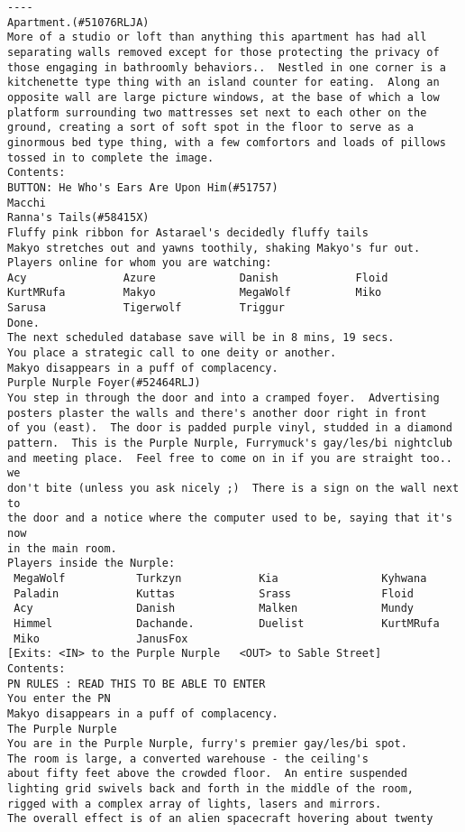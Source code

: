 \begin{verbatim}
----
Apartment.(#51076RLJA)
More of a studio or loft than anything this apartment has had all separating walls removed except for those protecting the privacy of those engaging in bathroomly behaviors..  Nestled in one corner is a kitchenette type thing with an island counter for eating.  Along an opposite wall are large picture windows, at the base of which a low platform surrounding two mattresses set next to each other on the ground, creating a sort of soft spot in the floor to serve as a ginormous bed type thing, with a few comfortors and loads of pillows tossed in to complete the image.
Contents:
BUTTON: He Who's Ears Are Upon Him(#51757)
Macchi
Ranna's Tails(#58415X)
Fluffy pink ribbon for Astarael's decidedly fluffy tails
Makyo stretches out and yawns toothily, shaking Makyo's fur out.
Players online for whom you are watching:
Acy               Azure             Danish            Floid             
KurtMRufa         Makyo             MegaWolf          Miko              
Sarusa            Tigerwolf         Triggur           
Done.
The next scheduled database save will be in 8 mins, 19 secs.
You place a strategic call to one deity or another.
Makyo disappears in a puff of complacency.
Purple Nurple Foyer(#52464RLJ)
You step in through the door and into a cramped foyer.  Advertising
posters plaster the walls and there's another door right in front
of you (east).  The door is padded purple vinyl, studded in a diamond
pattern.  This is the Purple Nurple, Furrymuck's gay/les/bi nightclub
and meeting place.  Feel free to come on in if you are straight too.. we
don't bite (unless you ask nicely ;)  There is a sign on the wall next to
the door and a notice where the computer used to be, saying that it's now
in the main room.
Players inside the Nurple:
 MegaWolf           Turkzyn            Kia                Kyhwana
 Paladin            Kuttas             Srass              Floid
 Acy                Danish             Malken             Mundy
 Himmel             Dachande.          Duelist            KurtMRufa
 Miko               JanusFox          
[Exits: <IN> to the Purple Nurple   <OUT> to Sable Street]
Contents:
PN RULES : READ THIS TO BE ABLE TO ENTER
You enter the PN
Makyo disappears in a puff of complacency.
The Purple Nurple
You are in the Purple Nurple, furry's premier gay/les/bi spot.  
The room is large, a converted warehouse - the ceiling's
about fifty feet above the crowded floor.  An entire suspended
lighting grid swivels back and forth in the middle of the room,
rigged with a complex array of lights, lasers and mirrors.  
The overall effect is of an alien spacecraft hovering about twenty

\end{verbatim}
